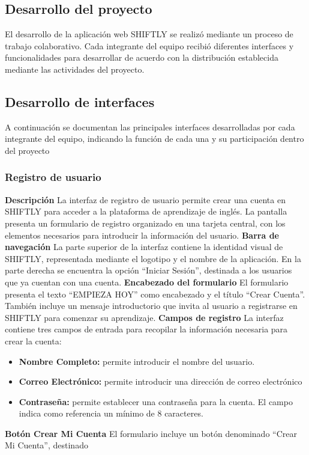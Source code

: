 \subsection{Desarrollo del proyecto}
El desarrollo de la aplicación web SHIFTLY se realizó mediante un proceso
de trabajo colaborativo. Cada integrante del equipo recibió diferentes
interfaces y funcionalidades para desarrollar de acuerdo con la
distribución establecida mediante las actividades del proyecto.
\subsection{Desarrollo de interfaces}
A continuación se documentan las principales interfaces desarrolladas por
cada integrante del equipo, indicando la función de cada una y su
participación dentro del proyecto
\subsubsection{Registro de usuario}
\textbf{Descripción}
La interfaz de registro de usuario permite crear una cuenta en SHIFTLY
para acceder a la plataforma de aprendizaje de inglés. La pantalla
presenta un formulario de registro organizado en una tarjeta central, con
los elementos necesarios para introducir la información del usuario.
\textbf{Barra de navegación}
La parte superior de la interfaz contiene la identidad visual de SHIFTLY,
representada mediante el logotipo y el nombre de la aplicación. En la
parte derecha se encuentra la opción ``Iniciar Sesión'', destinada a los
usuarios que ya cuentan con una cuenta.
\textbf{Encabezado del formulario}
El formulario presenta el texto ``EMPIEZA HOY'' como encabezado y el título
``Crear Cuenta''. También incluye un mensaje introductorio que invita al
usuario a registrarse en SHIFTLY para comenzar su aprendizaje.
\textbf{Campos de registro}
La interfaz contiene tres campos de entrada para recopilar la información
necesaria para crear la cuenta:
\begin{itemize}
\item \textbf{Nombre Completo:} permite introducir el nombre del usuario.  
\item \textbf{Correo Electrónico:} permite introducir una dirección de
correo electrónico 
\item \textbf{Contraseña:} permite establecer una contraseña para la
cuenta. El campo indica como referencia un mínimo de 8 caracteres.
\end{itemize}
\textbf{Botón Crear Mi Cuenta}
El formulario incluye un botón denominado ``Crear Mi Cuenta'', destinado
